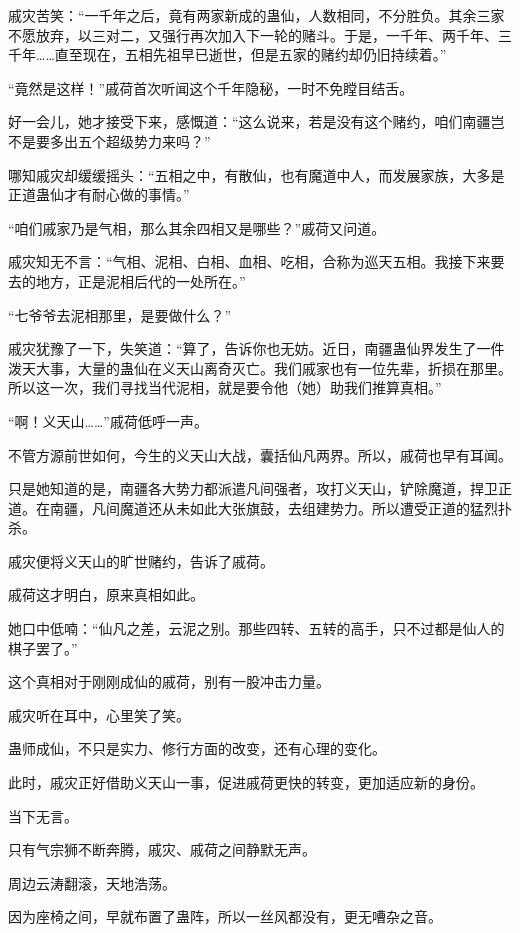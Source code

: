 \begin{this_body}
戚灾苦笑：“一千年之后，竟有两家新成的蛊仙，人数相同，不分胜负。其余三家不愿放弃，以三对二，又强行再次加入下一轮的赌斗。于是，一千年、两千年、三千年……直至现在，五相先祖早已逝世，但是五家的赌约却仍旧持续着。”

“竟然是这样！”戚荷首次听闻这个千年隐秘，一时不免瞠目结舌。

好一会儿，她才接受下来，感慨道：“这么说来，若是没有这个赌约，咱们南疆岂不是要多出五个超级势力来吗？”

哪知戚灾却缓缓摇头：“五相之中，有散仙，也有魔道中人，而发展家族，大多是正道蛊仙才有耐心做的事情。”

“咱们戚家乃是气相，那么其余四相又是哪些？”戚荷又问道。

戚灾知无不言：“气相、泥相、白相、血相、吃相，合称为巡天五相。我接下来要去的地方，正是泥相后代的一处所在。”

“七爷爷去泥相那里，是要做什么？”

戚灾犹豫了一下，失笑道：“算了，告诉你也无妨。近日，南疆蛊仙界发生了一件泼天大事，大量的蛊仙在义天山离奇灭亡。我们戚家也有一位先辈，折损在那里。所以这一次，我们寻找当代泥相，就是要令他（她）助我们推算真相。”

“啊！义天山……”戚荷低呼一声。

不管方源前世如何，今生的义天山大战，囊括仙凡两界。所以，戚荷也早有耳闻。

只是她知道的是，南疆各大势力都派遣凡间强者，攻打义天山，铲除魔道，捍卫正道。在南疆，凡间魔道还从未如此大张旗鼓，去组建势力。所以遭受正道的猛烈扑杀。

戚灾便将义天山的旷世赌约，告诉了戚荷。

戚荷这才明白，原来真相如此。

她口中低喃：“仙凡之差，云泥之别。那些四转、五转的高手，只不过都是仙人的棋子罢了。”

这个真相对于刚刚成仙的戚荷，别有一股冲击力量。

戚灾听在耳中，心里笑了笑。

蛊师成仙，不只是实力、修行方面的改变，还有心理的变化。

此时，戚灾正好借助义天山一事，促进戚荷更快的转变，更加适应新的身份。

当下无言。

只有气宗狮不断奔腾，戚灾、戚荷之间静默无声。

周边云涛翻滚，天地浩荡。

因为座椅之间，早就布置了蛊阵，所以一丝风都没有，更无嘈杂之音。


\end{this_body}
